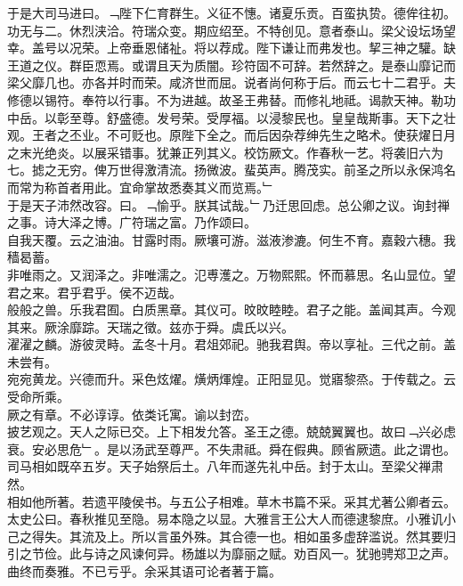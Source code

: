 \documentclass{zhvt-classic}
\begin{document}
\hspace*{2em}于是大司马进曰。﹁陛下仁育群生。义征不憓。诸夏乐贡。百蛮执贽。德侔往初。功无与二。休烈浃洽。符瑞众变。期应绍至。不特创见。意者泰山。梁父设坛场望幸。盖号以况荣。上帝垂恩储祉。将以荐成。陛下谦让而弗发也。挈三神之驩。缺王道之仪。群臣恧焉。或谓且天为质闇。珍符固不可辞。若然辞之。是泰山靡记而梁父靡几也。亦各并时而荣。咸济世而屈。说者尚何称于后。而云七十二君乎。夫修德以锡符。奉符以行事。不为进越。故圣王弗替。而修礼地祗。谒款天神。勒功中岳。以彰至尊。舒盛德。发号荣。受厚福。以浸黎民也。皇皇哉斯事。天下之壮观。王者之丕业。不可贬也。原陛下全之。而后因杂荐绅先生之略术。使获燿日月之末光绝炎。以展采错事。犹兼正列其义。校饬厥文。作春秋一艺。将袭旧六为七。摅之无穷。俾万世得激清流。扬微波。蜚英声。腾茂实。前圣之所以永保鸿名而常为称首者用此。宜命掌故悉奏其义而览焉。﹂\\
\hspace*{2em}于是天子沛然改容。曰。﹁愉乎。朕其试哉。﹂乃迁思回虑。总公卿之议。询封禅之事。诗大泽之博。广符瑞之富。乃作颂曰。\\
\hspace*{2em}自我天覆。云之油油。甘露时雨。厥壤可游。滋液渗漉。何生不育。嘉穀六穗。我穑曷蓄。\\
\hspace*{2em}非唯雨之。又润泽之。非唯濡之。氾尃濩之。万物熙熙。怀而慕思。名山显位。望君之来。君乎君乎。侯不迈哉。\\
\hspace*{2em}般般之兽。乐我君囿。白质黑章。其仪可。旼旼睦睦。君子之能。盖闻其声。今观其来。厥涂靡踪。天瑞之徵。兹亦于舜。虞氏以兴。\\
\hspace*{2em}濯濯之麟。游彼灵畤。孟冬十月。君俎郊祀。驰我君舆。帝以享祉。三代之前。盖未尝有。\\
\hspace*{2em}宛宛黄龙。兴德而升。采色炫燿。熿炳煇煌。正阳显见。觉寤黎烝。于传载之。云受命所乘。\\
\hspace*{2em}厥之有章。不必谆谆。依类讬寓。谕以封峦。\\
\hspace*{2em}披艺观之。天人之际已交。上下相发允答。圣王之德。兢兢翼翼也。故曰﹁兴必虑衰。安必思危﹂。是以汤武至尊严。不失肃祗。舜在假典。顾省厥遗。此之谓也。\\
\hspace*{2em}司马相如既卒五岁。天子始祭后土。八年而遂先礼中岳。封于太山。至梁父禅肃然。\\
\hspace*{2em}相如他所著。若遗平陵侯书。与五公子相难。草木书篇不采。采其尤著公卿者云。\\
\hspace*{2em}太史公曰。春秋推见至隐。易本隐之以显。大雅言王公大人而德逮黎庶。小雅讥小己之得失。其流及上。所以言虽外殊。其合德一也。相如虽多虚辞滥说。然其要归引之节俭。此与诗之风谏何异。杨雄以为靡丽之赋。劝百风一。犹驰骋郑卫之声。曲终而奏雅。不已亏乎。余采其语可论者著于篇。\\
\end{document}
